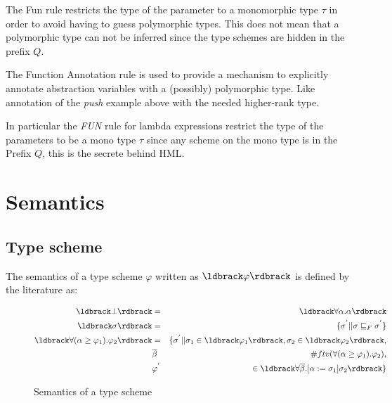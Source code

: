 \begin{prooftree}
\end{prooftree}

The Fun rule restricts the type of the parameter to a monomorphic type $\tau$ in order to avoid having to guess polymorphic types. This does not mean that a polymorphic type can not be inferred since the type schemes are hidden in the prefix $Q$.

\begin{prooftree}
\end{prooftree}

The Function Annotation rule is used to provide a mechanism to explicitly annotate abstraction variables with a (possibly) polymorphic type. Like annotation of the \textit{push} example above with the needed higher-rank type.

In particular the \textit{FUN} rule for lambda expressions restrict the type of the parameters to be a mono type $\tau$ since any scheme on the mono type is in the Prefix $Q$, this is the secrete behind HML.
\section{Semantics}
\subsection{Type scheme}
The semantics of a type scheme $\varphi$ written as $\br{\varphi}$  is defined by the literature as:
\begin{figure}[H]
\begin{eqnarray*}
\br{\bot} & = & \br{\forall\alpha . \alpha} \\
\br{\sigma} & = & \{ \sigma^{'} || \sigma \sqsubseteq_F \sigma^{'} \} \\
\br{\forall(\alpha \geq \varphi_1).\varphi_2} & = & \{ \sigma^{'} || \sigma_1  \in \br{\varphi_1}, \sigma_2 \in \br{\varphi_2}, \\ 
   &\overline{\beta}& \# ftv(\forall(\alpha \geq \varphi_1).\varphi_2), \\
   &\varphi^{'} & \in \br{\forall\overline{\beta}.\lbrack \alpha := \sigma_1 \rbrack\sigma_2}  \} 
\end{eqnarray*}
\caption{Semantics of a type scheme}
\end{figure}

